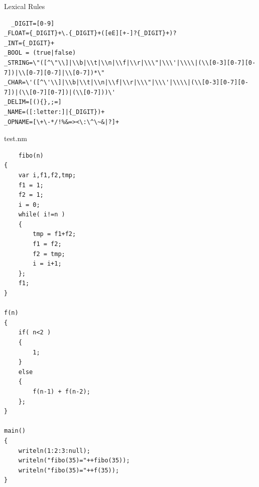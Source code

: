 \documentclass{homework}
\begin{document}
\newpage
\begin{question}{Lexical Rules}
\end{question}
\begin{answer}
  \begin{verbatim}
  _DIGIT=[0-9]
_FLOAT={_DIGIT}+\.{_DIGIT}+([eE][+-]?{_DIGIT}+)?
_INT={_DIGIT}+
_BOOL = (true|false)
_STRING=\"([^\"\\]|\\b|\\t|\\n|\\f|\\r|\\\"|\\\'|\\\\|(\\[0-3][0-7][0-7])|\\[0-7][0-7]|\\[0-7])*\"
_CHAR=\'([^\'\\]|\\b|\\t|\\n|\\f|\\r|\\\"|\\\'|\\\\|(\\[0-3][0-7][0-7])|(\\[0-7][0-7])|(\\[0-7]))\'
_DELIM=[(){},;=]
_NAME=([:letter:]|{_DIGIT})+
_OPNAME=[\+\-*/!%&=><\:\^\~&|?]+
  \end{verbatim}
\end{answer}


\newpage
\begin{question}{test.nm}
  \begin{verbatim}
    fibo(n)
{
	var i,f1,f2,tmp;
	f1 = 1;
	f2 = 1;
	i = 0;
	while( i!=n )
	{
		tmp = f1+f2;
		f1 = f2;
		f2 = tmp;
		i = i+1;
	};
	f1;
}

f(n)
{
	if( n<2 )
	{
		1;
	}
	else
	{
		f(n-1) + f(n-2);
	};
}

main()
{
	writeln(1:2:3:null);
	writeln("fibo(35)="++fibo(35));
	writeln("fibo(35)="++f(35));
}
  \end{verbatim}
\end{question}
\begin{answer}
  \begin{figure}[H]
    \centering
  \end{figure}
\end{answer}
\end{document}
